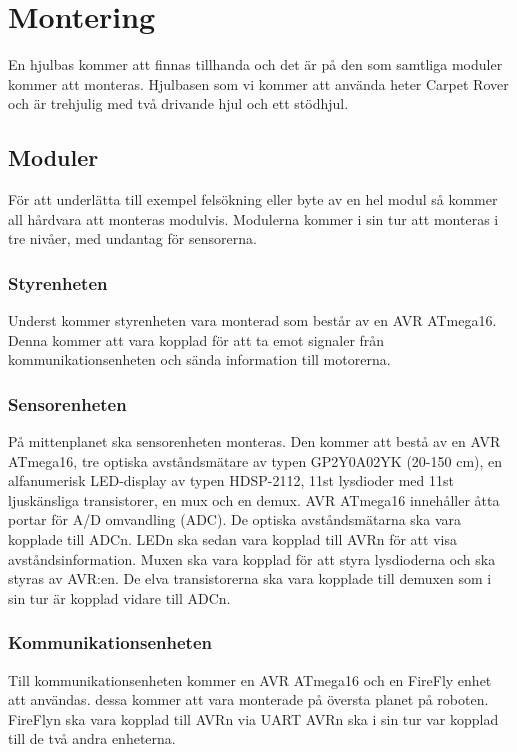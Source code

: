 \section{Montering}
En hjulbas kommer att finnas tillhanda och det är på den som samtliga moduler kommer att monteras. Hjulbasen som vi kommer att använda heter Carpet Rover och är trehjulig med två drivande hjul och ett stödhjul.

\subsection{Moduler}
För att underlätta till exempel felsökning eller byte av en hel modul så kommer all hårdvara att monteras modulvis. Modulerna kommer i sin tur att monteras i tre nivåer, med undantag för sensorerna. 

\subsubsection{Styrenheten}
Underst kommer styrenheten vara monterad som består av en AVR ATmega16. Denna kommer att vara kopplad för att ta emot signaler från kommunikationsenheten och sända information till motorerna.

\subsubsection{Sensorenheten}
På mittenplanet ska sensorenheten monteras. Den kommer att bestå av en AVR ATmega16, tre optiska avståndsmätare av typen GP2Y0A02YK (20-150 cm), en alfanumerisk LED-display av typen HDSP-2112, 11st lysdioder med 11st ljuskänsliga transistorer, en mux och en demux. AVR ATmega16 innehåller åtta portar för A/D omvandling (ADC). De optiska avståndsmätarna ska vara kopplade till ADCn. LEDn ska sedan vara kopplad till AVRn för att visa avståndsinformation. Muxen ska vara kopplad för att styra lysdioderna och ska styras av AVR:en.  De elva transistorerna ska vara kopplade till demuxen som  i sin tur är kopplad vidare till ADCn.

\subsubsection{Kommunikationsenheten}
Till kommunikationsenheten kommer en AVR ATmega16 och en FireFly enhet att användas. dessa kommer att vara monterade på översta planet på roboten. FireFlyn ska vara kopplad till AVRn via UART AVRn ska i sin tur var kopplad till de två andra enheterna.

